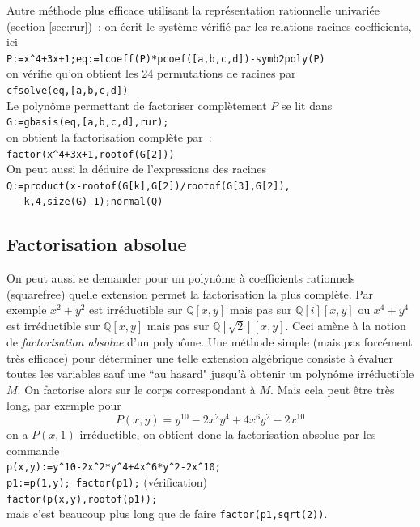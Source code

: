 \documentclass[a4paper,11pt]{article}
\newcommand{\Q}{{\mathbb{Q}}}
\begin{document}
Autre m\'ethode plus efficace utilisant la repr\'esentation rationnelle
univari\'ee (section \ref{sec:rur})~: 
on \'ecrit le syst\`eme v\'erifi\'e par les relations
racines-coefficients, ici\\
\verb|P:=x^4+3x+1;eq:=lcoeff(P)*pcoef([a,b,c,d])-symb2poly(P)|\\
on v\'erifie qu'on obtient les 24 permutations de racines par\\
\verb|cfsolve(eq,[a,b,c,d])|\\
Le polyn\^ome permettant de factoriser compl\`etement $P$ se lit dans\\
\verb|G:=gbasis(eq,[a,b,c,d],rur);|\\
on obtient la factorisation compl\`ete par~:\\
\verb|factor(x^4+3x+1,rootof(G[2]))|\\
On peut aussi la d\'eduire de l'expressions des racines\\
\verb|Q:=product(x-rootof(G[k],G[2])/rootof(G[3],G[2]),|\\
\verb|   k,4,size(G)-1);normal(Q)|

\subsection{Factorisation absolue} \label{sec:factorisation_absolue}
On peut aussi se demander pour un polyn\^ome \`a coefficients
rationnels (squarefree) quelle extension 
permet la factorisation la plus
compl\`ete. Par exemple $x^2+y^2$ est irr\'eductible sur $\Q[x,y]$
mais pas sur $\Q[i][x,y]$ ou $x^4+y^4$ est irr\'eductible sur $\Q[x,y]$
mais pas sur $\Q[\sqrt{2}][x,y]$. Ceci am\`ene \`a la notion
de {\em factorisation absolue} d'un polyn\^ome. Une m\'ethode simple
(mais pas forc\'ement tr\`es efficace) pour d\'eterminer une telle
extension alg\'ebrique consiste \`a \'evaluer toutes les variables
sauf une ``au hasard" jusqu'\`a obtenir un polyn\^ome irr\'eductible $M$.
On factorise alors sur le corps correspondant \`a $M$. Mais cela
peut \^etre tr\`es long, par exemple pour 
\[ P(x,y)=y^{10}-2x^2y^4+4x^6y^2-2x^{10}\]
on a $P(x,1)$ irr\'eductible, on obtient donc la factorisation
absolue par les commande\\
\verb|p(x,y):=y^10-2x^2*y^4+4x^6*y^2-2x^10;|\\
\verb|p1:=p(1,y); factor(p1);| (v\'erification)\\
\verb|factor(p(x,y),rootof(p1));|\\
mais c'est beaucoup plus long que de faire \verb|factor(p1,sqrt(2))|.
\end{document}
